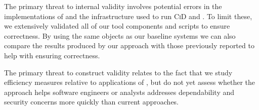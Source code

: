 The primary threat to internal validity involves
potential errors in the implementations of \@approach
and the infrastructure used to run \textsc{CiD} and
\@approach.  To limit these, we extensively validated
all of our tool components and scripts to ensure
correctness.  By using the same objects as our baseline
systems we can also compare the results produced by our
approach with those previously reported to help with
ensuring correctness.

The primary threat to construct validity relates to the
fact that we study efficiency measures relative to
applications of \@approach, but do not yet assess
whether the approach helps software engineers or
analysts addresses dependability and security concerns
more quickly than current approaches.
